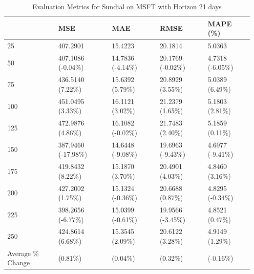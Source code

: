 \begin{table}
\caption{Evaluation Metrics for Sundial on MSFT with Horizon 21 days}
\label{tab:sundial_MSFT_h21_metrics}
\begin{tabular}{lllll}
\toprule
 & MSE & MAE & RMSE & MAPE (\%) \\
\midrule
25 & 407.2901 & 15.4223 & 20.1814 & 5.0363 \\
50 & 407.1086 (-0.04\%) & 14.7836 (-4.14\%) & 20.1769 (-0.02\%) & 4.7318 (-6.05\%) \\
75 & 436.5140 (7.22\%) & 15.6392 (5.79\%) & 20.8929 (3.55\%) & 5.0389 (6.49\%) \\
100 & 451.0495 (3.33\%) & 16.1121 (3.02\%) & 21.2379 (1.65\%) & 5.1803 (2.81\%) \\
125 & 472.9876 (4.86\%) & 16.1082 (-0.02\%) & 21.7483 (2.40\%) & 5.1859 (0.11\%) \\
150 & 387.9460 (-17.98\%) & 14.6448 (-9.08\%) & 19.6963 (-9.43\%) & 4.6977 (-9.41\%) \\
175 & 419.8432 (8.22\%) & 15.1870 (3.70\%) & 20.4901 (4.03\%) & 4.8460 (3.16\%) \\
200 & 427.2002 (1.75\%) & 15.1324 (-0.36\%) & 20.6688 (0.87\%) & 4.8295 (-0.34\%) \\
225 & 398.2656 (-6.77\%) & 15.0399 (-0.61\%) & 19.9566 (-3.45\%) & 4.8521 (0.47\%) \\
250 & 424.8614 (6.68\%) & 15.3545 (2.09\%) & 20.6122 (3.28\%) & 4.9149 (1.29\%) \\
Average \% Change & (0.81\%) & (0.04\%) & (0.32\%) & (-0.16\%) \\
\bottomrule
\end{tabular}
\end{table}
